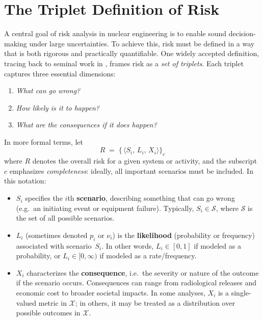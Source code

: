 \section{The Triplet Definition of Risk}
\label{sec:triplet_definition_of_risk}
A central goal of risk analysis in nuclear engineering is to enable sound decision-making under large uncertainties. To achieve this, risk must be defined in a way that is both rigorous and practically quantifiable. One widely accepted definition, tracing back to seminal work in \cite{kaplan_quantitative_1981, garrick_quantifying_2008}, frames risk as a \emph{set of triplets}. Each triplet captures three essential dimensions:

\begin{enumerate}
  \item \textit{What can go wrong?}
  \item \textit{How likely is it to happen?}
  \item \textit{What are the consequences if it does happen?}
\end{enumerate}

In more formal terms, let
\begin{equation}
\label{eq:risk_triplets}
    R \;=\;
    \bigl\{\,
        \langle
            S_i,\,
            L_i,\,
            X_i
        \rangle
    \bigr\}_{c}
\end{equation}
where \(R\) denotes the overall risk for a given system or activity, and the subscript \(c\) emphasizes \emph{completeness}: ideally, all important scenarios must be included. In this notation:
\begin{itemize}
    \item \(S_i\) specifies the \(i\)th \textbf{scenario}, describing something that can go wrong (e.g.\ an initiating event or equipment failure).  Typically, \(S_i \in \mathcal{S}\), where \(\mathcal{S}\) is the set of all possible scenarios.
    \item \(L_i\) (sometimes denoted \(p_i\) or \(\nu_i\)) is the \textbf{likelihood} (probability or frequency) associated with scenario~\(S_i\).  In other words, \(L_i\in [0,1]\) if modeled as a probability, or \(L_i\in [0,\infty)\) if modeled as a rate/frequency.
    \item \(X_i\) characterizes the \textbf{consequence}, i.e.\ the severity or nature of the outcome if the scenario occurs. Consequences can range from radiological releases and economic cost to broader societal impacts. In some analyses, \(X_i\) is a single-valued metric in \(\mathcal{X}\); in others, it may be treated as a distribution over possible outcomes in \(\mathcal{X}\).
\end{itemize}


